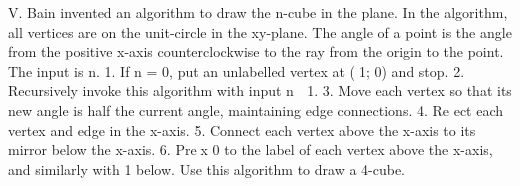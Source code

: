 
V. Bain invented an algorithm to draw the n-cube in the plane. In the algorithm,
all vertices are on the unit-circle in the xy-plane. The angle of a point is the angle
from the positive x-axis counterclockwise to the ray from the origin to the point. The
input is n.
1. If n = 0, put an unlabelled vertex at (􀀀1; 0) and stop.
2. Recursively invoke this algorithm with input n 􀀀 1.
3. Move each vertex so that its new angle is half the current angle, maintaining edge
connections.
4. Re
ect each vertex and edge in the x-axis.
5. Connect each vertex above the x-axis to its mirror below the x-axis.
6. Prex 0 to the label of each vertex above the x-axis, and similarly with 1 below.
Use this algorithm to draw a 4-cube.

